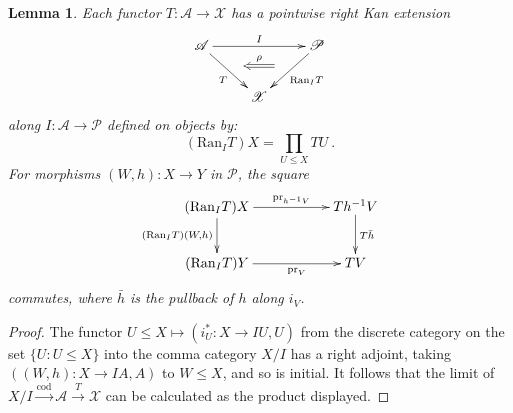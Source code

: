 \documentclass[a4paper,12pt,reqno]{amsart}
\newtheorem{lemma}[theorem]{Lemma}
\theoremstyle{definition}
\theoremstyle{fact}
\theoremstyle{genquest}
\theoremstyle{step}
\newcommand{\dd}{\colon}
\newcommand{\lra}{\longrightarrow}
\newcommand{\ra}{\rightarrow}
\def\CA{{\mathscr A}}
\def\CP{{\mathscr P}}
\def\CX{{\mathscr X}}
\begin{document}
\begin{lemma}
Each functor $T\dd \CA \ra \CX$ has a pointwise right Kan extension
\begin{equation}
\begin{aligned}
\xymatrix{
\CA \ar[rd]_{T}^(0.5){\phantom{a}}="1" \ar[rr]^{I}  && \CP \ar[ld]^{\mathrm{Ran}_IT}_(0.5){\phantom{a}}="2" \ar@{<=}"1";"2"^-{\rho}
\\
& \CX 
}
\end{aligned}
\end{equation}  
along $I\dd \CA \ra \CP$ defined on objects by:
$$(\mathrm{Ran}_IT)X = \prod_{U\le X}TU \ .$$
For morphisms $(W,h) \dd X\ra Y$ in $\CP$, the square
\begin{equation}
\begin{aligned}
\xymatrix{
(\mathrm{Ran}_IT)X \ar[rr]^-{\mathrm{pr}_{h^{-1}V}} \ar[d]_-{(\mathrm{Ran}_IT)(W,h)} && Th^{-1}V \ar[d]^-{T\bar{h}} \\
(\mathrm{Ran}_IT)Y \ar[rr]_-{\mathrm{pr}_V} && TV 
}
\end{aligned}
\end{equation}
commutes, where $\bar{h}$ is the pullback of $h$ along $i_V$.
\end{lemma}
\begin{proof}
The functor $U\le X \mapsto (i_U^* \dd X\ra IU, U)$ from the discrete category 
on the set $\{U \dd U\le X\}$ into the comma category
$X/I$ has a right adjoint, taking $((W,h)\dd X\ra IA,A)$ to $W\le X$, and so is initial. 
It follows that the limit of 
$X/I \stackrel{\mathrm{cod}}\lra \CA \stackrel{T}\lra \CX$
can be calculated as the product displayed.
\end{proof}
\end{document}
